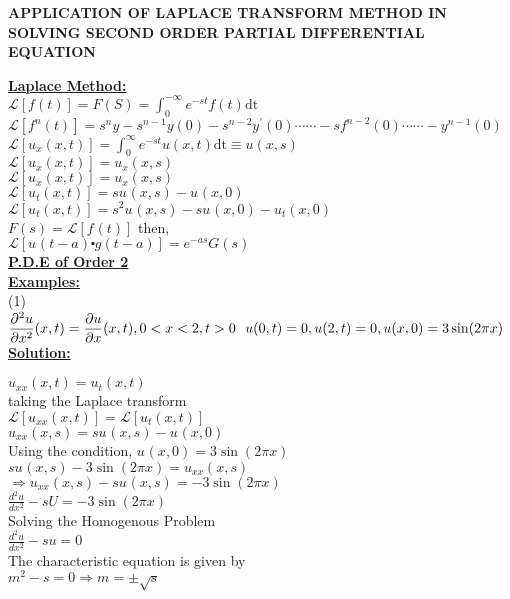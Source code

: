 \documentclass[a4paper 11pt]{article}
\newcommand{\Laplace}{\mathcal{L}}
\newcommand{\ft}{f(t)}
\newcommand{\ftn}[1]{f^{#1}(t)}
\newcommand{\FS}{F(S)}
\newcommand{\LaplaceIntegral}{\int_{0}^{-\infty}e^{-st}\ft\text{dt}}
\newcommand{\sbracket}[1]{\left[#1\right]}
\newcommand{\Yn}[1]{y^{#1}(0)}
\newcommand{\fn}[1]{f^{#1}(0)}
\newcommand{\Sn}[1]{s^{#1}}
\newcommand{\LUx}[1]{\Laplace\sbracket{u_{#1}(x,t)}}
\newcommand{\Un}[2]{u_{#1}(#2)}
\newcommand{\LInt}{\int_{0}^{\infty}e^{-st}u(x,t)\text{dt}}
\newcommand{\LFt}{\Laplace \sbracket{\ftn{}}}
\newcommand{\NI}{\noindent}
\newcommand{\LFn}[1]{\Laplace \sbracket{#1}}
\begin{document}
\begin{center}
\textbf{APPLICATION OF LAPLACE TRANSFORM METHOD IN SOLVING SECOND ORDER PARTIAL DIFFERENTIAL EQUATION} \\[1.5cm]
\end{center}

\NI \underline{\textbf{Laplace Method:}}\\[0.2cm]

\NI $\Laplace\left[\ft\right] = \FS = \LaplaceIntegral$ \\[0.1cm]
$ \Laplace \sbracket{\ftn{n}}  = s^{n}y - \Sn{n-1}y(0) - \Sn{n-2}\Yn{\prime} \cdots\cdots - s\fn{n-2} \cdots\cdots - y^{n-1}(0) $ \\[0.1cm]
$\LUx{x} = \LInt \equiv u(x,s) $\\[0.1cm]
$\LUx{x} = \Un{x}{x,s}$\\[0.1cm]
$\LUx{x} = \Un{x}{x,s}$\\[0.1cm]
$\LUx{t} = s\Un{}{x,s} - \Un{}{x,0}$\\[0.1cm]
$\LUx{t} = s^{2}\Un{}{x,s} - s\Un{}{x,0} - \Un{t}{x,0}$\\[0.1cm]
$F(s) = \LFt $ then,\\[0.2cm]
$\Laplace\sbracket{\Un{}{t-a}\centerdot g(t-a)} = e^{-as}G(s)$\\[.6cm]

\NI \underline{\textbf{P.D.E of Order 2}}\\[0.1cm]

\NI \underline{\textbf{Examples:}}\\[0.2cm]

\NI (1) ${\displaystyle \frac{\partial^{2}u}{\partial x^{2}}(x,t) = \frac{\partial u}{\partial x}(x,t), 0 < x < 2, t > 0  \text{ \text{ }} u(0,t) = 0, u(2,t) = 0, u(x,0) = 3\sin(2\pi x)}$\\

\NI \underline{\textbf{Solution:}}

\NI $\Un{xx}{x,t} = \Un{t}{x,t}$\\[0.2cm]
taking the Laplace transform \\[0.2cm]
$\LFn{\Un{xx}{x,t}} = \LFn{\Un{t}{x,t}}$\\[0.2cm]
$\Un{xx}{x,s} = s\Un{}{x,s} - \Un{}{x,0}$\\[0.7cm]
Using the condition, $\Un{}{x,0} = 3\sin(2\pi x)$ \\[0.2cm]
$s\Un{}{x,s} - 3\sin(2\pi x) = \Un{xx}{x,s}$ \\[0.2cm]
$\Longrightarrow \Un{xx}{x,s} - s\Un{}{x,s} = - 3\sin(2\pi x)$ \\[0.2cm]
${\displaystyle \frac{d^{2}u}{dx^{2}} - sU = - 3\sin(2\pi x)}$\\[0.7cm]
Solving the Homogenous Problem \\[0.2cm]
${\displaystyle \frac{d^{2}u}{dx^{2}} - su = 0}$\\[0.7cm]
The characteristic equation is given by \\[0.2cm]
$m^2 - s = 0 \Rightarrow m = \pm \sqrt{s}$ \\[0.2cm]
\end{document}
